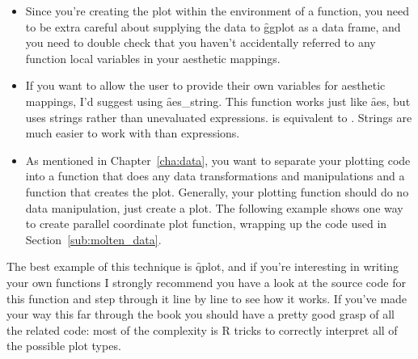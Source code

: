\begin{itemize}
  \item Since you're creating the plot within the environment of a function, you need to be extra careful about supplying the data to \f{ggplot} as a data frame, and you need to double check that you haven't accidentally referred to any function local variables in your aesthetic mappings.

  \item If you want to allow the user to provide their own variables for aesthetic mappings, I'd suggest using \f{aes_string}.  This function works just like \f{aes}, but uses strings rather than unevaluated expressions.  is equivalent to .  Strings are much easier to work with than expressions.

  \item As mentioned in Chapter~\ref{cha:data}, you want to separate your plotting code into a function that does any data transformations and manipulations and a function that creates the plot. Generally, your plotting function should do no data manipulation, just create a plot. The following example shows one way to create parallel coordinate plot function, wrapping up the code used in Section~\ref{sub:molten_data}.

    
  
\end{itemize}

The best example of this technique is \f{qplot}, and if you're interesting in writing your own functions I strongly recommend you have a look at the source code for this function and step through it line by line to see how it works.  If you've made your way this far through the book you should have a pretty good grasp of all the \ggplot related code: most of the complexity is R tricks to correctly interpret all of the possible plot types.




